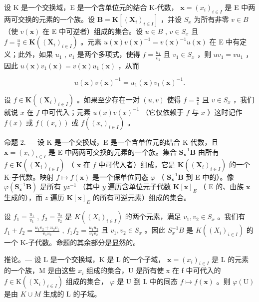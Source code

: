 设 K 是一个交换域，E 是一个含单位元的结合 K-代数， \(\mathbf{x} = (x_i)_{i \in I}\) 是 E 中两两可交换的元素的一个族。设 \(\mathbf{B} = \mathbf{K}[(\mathbf{X}_i)_{i \in I}]\) ，并设 \(S_x\) 为所有非零 \(v \in B\) （使 \(v(\mathbf{x})\) 在 E 中可逆者）组成的集合。设 \(u \in B\) , \(v \in S_x\) 且 \(f = \frac{u}{v} \in \mathbf{K}((\mathbf{X}_i)_{i \in I})\) 。元素 \(u(\mathbf{x}) v(\mathbf{x})^{-1} = v(\mathbf{x})^{-1} u(\mathbf{x})\) 在 E 中有定义；此外，如果 \(u_1\) , \(v_1\) 是两个多项式，使得 \(f = \frac{u_1}{v_1}\) 且 \(v_1 \in S_x\) ，则 \(uv_1 = vu_1\) ，因此 \(u(\mathbf{x}) v_1(\mathbf{x}) = v(\mathbf{x}) u_1(\mathbf{x})\) ，从而

\[
u (\mathbf {x}) v (\mathbf {x}) ^ {- 1} = u _ {1} (\mathbf {x}) v _ {1} (\mathbf {x}) ^ {- 1}.
\]

设 \(f \in \mathbf{K}((\mathbf{X}_i)_{i \in I})\) 。如果至少存在一对 \((u, v)\) 使得 \(f = \frac{u}{v}\) 且 \(v \in S_x\) ，我们就说 \(x\) 在 \(f\) 中可代入；元素 \(u(x) v(x)^{-1}\) （它仅依赖于 \(f\) 与 \(x\) ）这时记作 \(f(x)\) 或 \(f((x_i))\) 或 \(f((x_i)_{i \in I})\) 。

命题 2. --- 设 K 是一个交换域，E 是一个含单位元的结合 K-代数，且 \(\mathbf{x} = (x_i)_{i \in I}\) 是 E 中两两可交换的元素的一个族。集合 \(\mathbf{S}_{\mathbf{x}}^{-1}\mathbf{B}\) 由所有 \(f \in \mathbf{K}((\mathbf{X}_i)_{i \in I})\) （ \(\mathbf{x}\) 在 \(f\) 中可代入者）组成，它是 \(\mathbf{K}((\mathbf{X}_i)_{i \in I})\) 的一个 K-子代数。映射 \(f \mapsto f(\mathbf{x})\) 是一个保单位同态 \(\varphi\) （ \(\mathbf{S}_{\mathbf{x}}^{-1}\mathbf{B}\) 到 E 中的）。像 \(\varphi(\mathbf{S}_{\mathbf{x}}^{-1}\mathbf{B})\) 是所有 \(yz^{-1}\) （其中 \(y\) 遍历含单位元子代数 \(\mathbf{K}[\mathbf{x}]_E\) （ E 的、由族 \(\mathbf{x}\) 生成的），而 \(z\) 遍历 \(\mathbf{K}[\mathbf{x}]_E\) 的所有可逆元素）组成的集合。

设 \(f_{1} = \frac{u_{1}}{v_{1}}\) , \(f_{2} = \frac{u_{2}}{v_{2}}\) 是 \(K((X_{i})_{i\in I})\) 的两个元素，满足 \(v_{1}, v_{2} \in S_{x}\) 。我们有 \(f_{1} + f_{2} = \frac{u_{1}v_{2} + u_{2}v_{1}}{v_{1}v_{2}}\) , \(f_{1}f_{2} = \frac{u_{1}u_{2}}{v_{1}v_{2}}\) 且 \(v_{1}, v_{2} \in S_{x}\) 。因此 \(S_{x}^{-1}B\) 是 \(K((X_{i})_{i\in I})\) 的一个 K-子代数。命题的其余部分是显然的。

推论。--- 设 L 是一个交换域，K 是 L 的一个子域， \(\mathbf{x} = (x_i)_{i \in I}\) 是 L 的元素的一个族，M 是由这些 \(x_i\) 组成的集合，U 是所有使 x 在 f 中可代入的 \(f \in \mathrm{K}((\mathrm{X}_i)_{i \in I})\) 组成的集合， \(\varphi\) 是 U 到 L 中的同态 \(f \mapsto f(\mathbf{x})\) 。则 \(\varphi(\mathrm{U})\) 是由 \(K \cup M\) 生成的 L 的子域。

